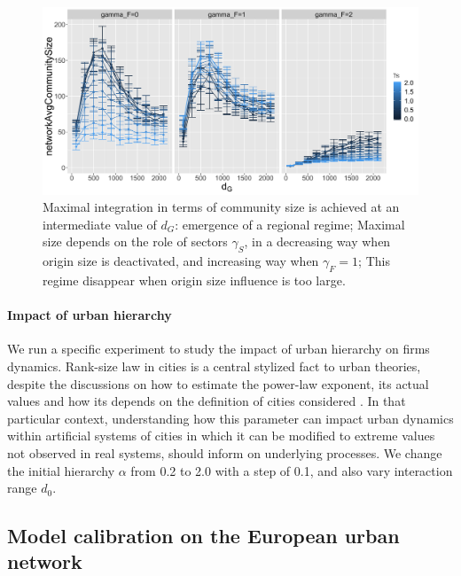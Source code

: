 \documentclass[10pt,letterpaper]{article}
\begin{document}
\begin{figure}
    \includegraphics[width=\textwidth]{figures/networkAvgCommunitySize_countryGravityDecay2100_gammaDestination0_facetwrapgammaOrigin_colorgammaSectors.png}
	\caption{Maximal integration in terms of community size is achieved at an intermediate value of $d_G$: emergence of a regional regime; Maximal size depends on the role of sectors $\gamma_S$, in a decreasing way when origin size is deactivated, and increasing way when $\gamma_F=1$; This regime disappear when origin size influence is too large.\label{fig:comsize}}
\end{figure}


\paragraph{Impact of urban hierarchy}

We run a specific experiment to study the impact of urban hierarchy on firms dynamics. Rank-size law in cities is a central stylized fact to urban theories, despite the discussions on how to estimate the power-law exponent, its actual values \cite{cottineau2017metazipf} and how its depends on the definition of cities considered \cite{corral2020truncated}. In that particular context, understanding how this parameter can impact urban dynamics within artificial systems of cities in which it can be modified to extreme values not observed in real systems, should inform on underlying processes. %
We change the initial hierarchy $\alpha$ from 0.2 to 2.0 with a step of 0.1, and also vary interaction range $d_0$.



\subsection*{Model calibration on the European urban network}
\end{document}

